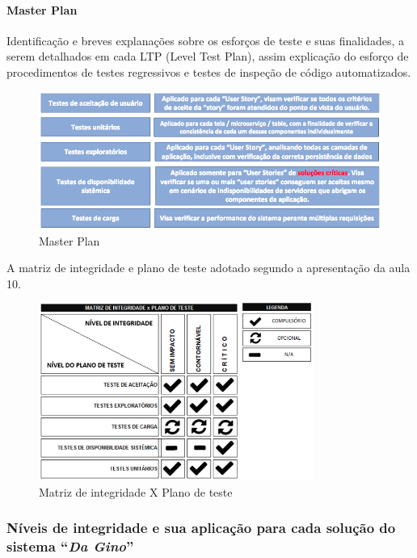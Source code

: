 \paragraph{Master Plan}

Identificação e breves explanações sobre os esforços de teste e suas finalidades, a serem detalhados em cada LTP (Level Test Plan), assim explicação do esforço de procedimentos de testes regressivos e testes de inspeção de código automatizados.

\begin{figure}[H]
  \centering
  \includegraphics[width=1\textwidth]{softwareengineer/images/master-plan} 
  \caption{Master Plan}
  \label{fig:masterplan} 
\end{figure}

A matriz de integridade e plano de teste adotado segundo a apresentação da aula 10.

\begin{figure}[H]
  \centering
  \includegraphics[width=0.8\textwidth]{softwareengineer/images/matrix-integrity} 
  \caption{Matriz de integridade X Plano de teste}
  \label{fig:matrix-integrity} 
\end{figure}

\subsubsection{Níveis de integridade e sua aplicação para cada solução do sistema “\textit{Da Gino}”}

